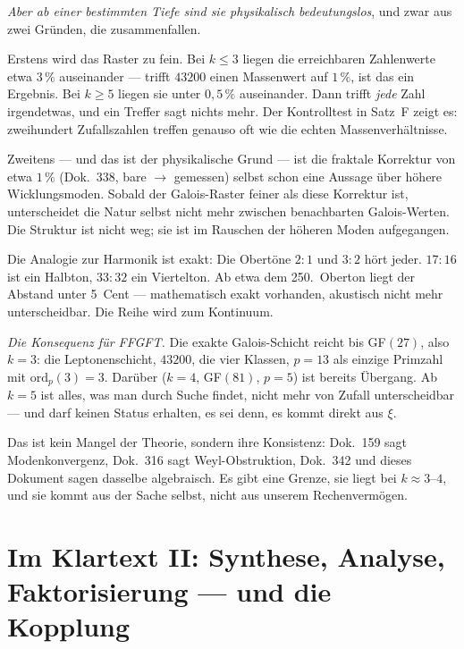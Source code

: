 \emph{Aber ab einer bestimmten Tiefe sind sie physikalisch bedeutungslos},
und zwar aus zwei Gründen, die zusammenfallen.

Erstens wird das Raster zu fein. Bei $k \leq 3$ liegen die erreichbaren
Zahlenwerte etwa $3\,\%$ auseinander --- trifft $43200$ einen Massenwert auf
$1\,\%$, ist das ein Ergebnis. Bei $k \geq 5$ liegen sie unter $0{,}5\,\%$
auseinander. Dann trifft \emph{jede} Zahl irgendetwas, und ein Treffer sagt
nichts mehr. Der Kontrolltest in Satz~F zeigt es: zweihundert Zufallszahlen
treffen genauso oft wie die echten Massenverhältnisse.

Zweitens --- und das ist der physikalische Grund --- ist die fraktale Korrektur
von etwa $1\,\%$ (Dok.~338, bare $\to$ gemessen) selbst schon eine Aussage
über höhere Wicklungsmoden. Sobald der Galois-Raster feiner als diese
Korrektur ist, unterscheidet die Natur selbst nicht mehr zwischen benachbarten
Galois-Werten. Die Struktur ist nicht weg; sie ist im Rauschen der höheren
Moden aufgegangen.

Die Analogie zur Harmonik ist exakt: Die Obertöne $2{:}1$ und $3{:}2$ hört
jeder. $17{:}16$ ist ein Halbton, $33{:}32$ ein Viertelton. Ab etwa dem
250.\ Oberton liegt der Abstand unter 5~Cent --- mathematisch exakt vorhanden,
akustisch nicht mehr unterscheidbar. Die Reihe wird zum Kontinuum.

\emph{Die Konsequenz für FFGFT.} Die exakte Galois-Schicht reicht bis GF$(27)$,
also $k = 3$: die Leptonenschicht, $43200$, die vier Klassen, $p = 13$ als
einzige Primzahl mit $\mathrm{ord}_p(3) = 3$. Darüber ($k = 4$, GF$(81)$,
$p = 5$) ist bereits Übergang. Ab $k = 5$ ist alles, was man durch Suche findet,
nicht mehr von Zufall unterscheidbar --- und darf keinen Status erhalten, es sei
denn, es kommt direkt aus $\xi$.

Das ist kein Mangel der Theorie, sondern ihre Konsistenz: Dok.~159 sagt
Modenkonvergenz, Dok.~316 sagt Weyl-Obstruktion, Dok.~342 und dieses Dokument
sagen dasselbe algebraisch. Es gibt eine Grenze, sie liegt bei $k \approx 3$--$4$,
und sie kommt aus der Sache selbst, nicht aus unserem Rechenvermögen.

\section{Im Klartext II: Synthese, Analyse, Faktorisierung --- und die Kopplung}

